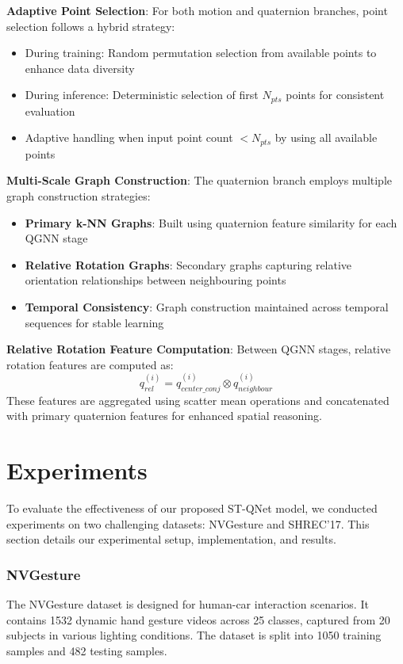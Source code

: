 \documentclass[journal]{IEEEtran}
\theoremstyle{plain}
\begin{document}
\textbf{Adaptive Point Selection}: For both motion and quaternion branches, point selection follows a hybrid strategy:
\begin{itemize}
    \item During training: Random permutation selection from available points to enhance data diversity
    \item During inference: Deterministic selection of first $N_{pts}$ points for consistent evaluation
    \item Adaptive handling when input point count $< N_{pts}$ by using all available points
\end{itemize}

\textbf{Multi-Scale Graph Construction}: The quaternion branch employs multiple graph construction strategies:
\begin{itemize}
    \item \textbf{Primary k-NN Graphs}: Built using quaternion feature similarity for each QGNN stage
    \item \textbf{Relative Rotation Graphs}: Secondary graphs capturing relative orientation relationships between neighbouring points
    \item \textbf{Temporal Consistency}: Graph construction maintained across temporal sequences for stable learning
\end{itemize}

\textbf{Relative Rotation Feature Computation}: Between QGNN stages, relative rotation features are computed as:
\begin{equation}
    q_{rel}^{(i)} = q_{center\_conj}^{(i)} \otimes q_{neighbour}^{(i)}
\end{equation}
These features are aggregated using scatter mean operations and concatenated with primary quaternion features for enhanced spatial reasoning.

\section{Experiments}\label{sec:experiment}
To evaluate the effectiveness of our proposed ST-QNet model, we conducted experiments on two challenging datasets: NVGesture and SHREC'17. This section details our experimental setup, implementation, and results.

\subsubsection{NVGesture}
The NVGesture dataset \cite{7780825} is designed for human-car interaction scenarios. It contains 1532 dynamic hand gesture videos across 25 classes, captured from 20 subjects in various lighting conditions. The dataset is split into 1050 training samples and 482 testing samples.
\end{document}
